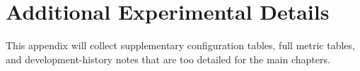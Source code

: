 \chapter{Additional Experimental Details}
\label{chap:appendix_experiments}

This appendix will collect supplementary configuration tables, full metric tables, and development-history notes that are too detailed for the main chapters.

